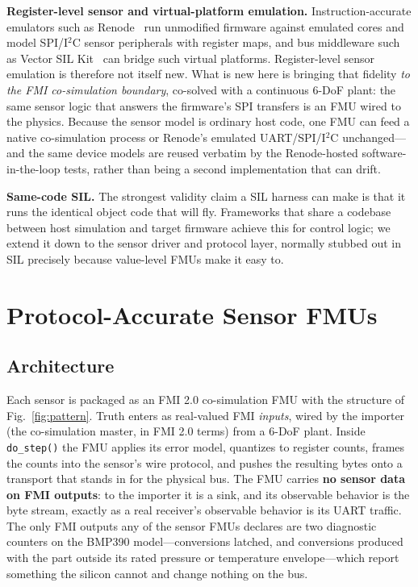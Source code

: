 \documentclass[preprint,12pt,a4paper]{elsarticle}
\newcommand{\code}[1]{\texttt{\small #1}}
\begin{document}
\textbf{Register-level sensor and virtual-platform emulation.}
Instruction-accurate emulators such as Renode~\cite{renode} run unmodified
firmware against emulated cores and model SPI/I$^2$C sensor peripherals with
register maps, and bus middleware such as Vector SIL Kit~\cite{silkit} can bridge
such virtual platforms. Register-level sensor emulation is therefore not itself
new. What is new here is bringing that fidelity \emph{to the FMI co-simulation
boundary}, co-solved with a continuous 6-DoF plant: the same sensor logic that
answers the firmware's SPI transfers is an FMU wired to the physics. Because the
sensor model is ordinary host code, one FMU can feed a native co-simulation
process or Renode's emulated UART/SPI/I$^2$C unchanged---and the same device
models are reused verbatim by the Renode-hosted software-in-the-loop tests,
rather than being a second implementation that can drift.

\textbf{Same-code SIL.} The strongest validity claim a SIL harness can make is
that it runs the identical object code that will fly. Frameworks that share a
codebase between host simulation and target firmware achieve this for control
logic; we extend it down to the sensor driver and protocol layer, normally
stubbed out in SIL precisely because value-level FMUs make it easy to.

\section{Protocol-Accurate Sensor FMUs}
\label{sec:method}

\subsection{Architecture}
Each sensor is packaged as an FMI 2.0 co-simulation FMU with the structure of
Fig.~\ref{fig:pattern}. Truth enters as real-valued FMI \emph{inputs}, wired by
the importer (the co-simulation master, in FMI 2.0 terms) from a 6-DoF plant. Inside \code{do\_step()} the FMU
applies its error model, quantizes to register counts, frames the counts into
the sensor's wire protocol, and pushes the resulting bytes onto a transport that
stands in for the physical bus. The FMU carries \textbf{no sensor data on FMI
outputs}: to the importer it is a sink, and its observable behavior is the
byte stream, exactly as a real receiver's observable behavior is its UART
traffic. The only FMI outputs any of the sensor FMUs declares are two
diagnostic counters on the BMP390 model---conversions latched, and conversions
produced with the part outside its rated pressure or temperature
envelope---which report something the silicon cannot and change nothing on the
bus.
\end{document}
